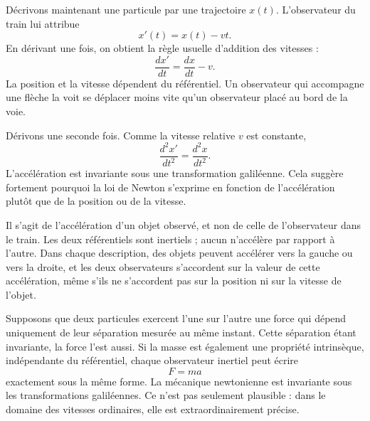 \begin{classroomqa}\end{classroomqa}

Décrivons maintenant une particule par une trajectoire \(x(t)\). L’observateur du train lui attribue
\begin{equation}
x'(t)=x(t)-vt.
\end{equation}
En dérivant une fois, on obtient la règle usuelle d’addition des vitesses :
\begin{equation}
\frac{dx'}{dt}=\frac{dx}{dt}-v.
\end{equation}
La position et la vitesse dépendent du référentiel. Un observateur qui accompagne une flèche la voit se déplacer moins vite qu’un observateur placé au bord de la voie.

Dérivons une seconde fois. Comme la vitesse relative \(v\) est constante,
\begin{equation}
\frac{d^2x'}{dt^2}=\frac{d^2x}{dt^2}.
\end{equation}
L’accélération est invariante sous une transformation galiléenne. Cela suggère fortement pourquoi la loi de Newton s’exprime en fonction de l’accélération plutôt que de la position ou de la vitesse.

Il s’agit de l’accélération d’un objet observé, et non de celle de l’observateur dans le train. Les deux référentiels sont inertiels ; aucun n’accélère par rapport à l’autre. Dans chaque description, des objets peuvent accélérer vers la gauche ou vers la droite, et les deux observateurs s’accordent sur la valeur de cette accélération, même s’ils ne s’accordent pas sur la position ni sur la vitesse de l’objet.

Supposons que deux particules exercent l’une sur l’autre une force qui dépend uniquement de leur séparation mesurée au même instant. Cette séparation étant invariante, la force l’est aussi. Si la masse est également une propriété intrinsèque, indépendante du référentiel, chaque observateur inertiel peut écrire
\begin{equation}
F=ma
\end{equation}
exactement sous la même forme. La mécanique newtonienne est invariante sous les transformations galiléennes. Ce n’est pas seulement plausible : dans le domaine des vitesses ordinaires, elle est extraordinairement précise.

